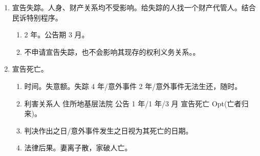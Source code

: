\begin{enumerate}
\begin{enumerate}
\begin{enumerate}
\begin{enumerate}
                        \end{enumerate}
                  \item 撤销与恢复。只有法院有权，其他人通过申请进行。
                        \begin{enumerate}
                          \item 积极的侵权行为。。
                          \item 消极的侵权行为。。
                          \item 向法院申请，民政局兜底。3 费（抚养费、赡养费、抚育费）继续履行。
                          \item 恢复。只能是父母、子女去申请。故意犯罪的不得申请恢复。
                        \end{enumerate}
                  \item 终止。4 种。长大了、病好了、变傻了、或者一方死亡了。
                  \item 被监护人受到侵权的诉讼时效。新增。都是主观起算。
                        \begin{enumerate}
                          \item 性侵以外。法定代理终止之日。
                          \item 性侵。18。\sjt 不要混。
                        \end{enumerate}
                \end{enumerate}
          \item 宣告失踪。人身、财产关系均不受影响。给失踪的人找一个财产代管人。结合民诉特别程序。
                \begin{enumerate}
                  \item 2 年。公告期 3 月。
                  \item 不申请宣告失踪，也不会影响其现存的权利义务关系。。
                \end{enumerate}
          \item 宣告死亡。
                \begin{enumerate}
                  \item 时间。失意额。失踪 4 年/意外事件 2 年/意外事件无法生还，随时。
                  \item 利害关系人 \yjt 住所地基层法院 \yjt 公告 1 年/1 年/3 月 \yjt 宣告死亡 \yjt Opt(亡者归来)。
                  \item 判决作出之日/意外事件发生之日视为其死亡的日期。
                  \item 法律后果。妻离子散，家破人亡。

\end{enumerate}
\end{enumerate}
\end{enumerate}
